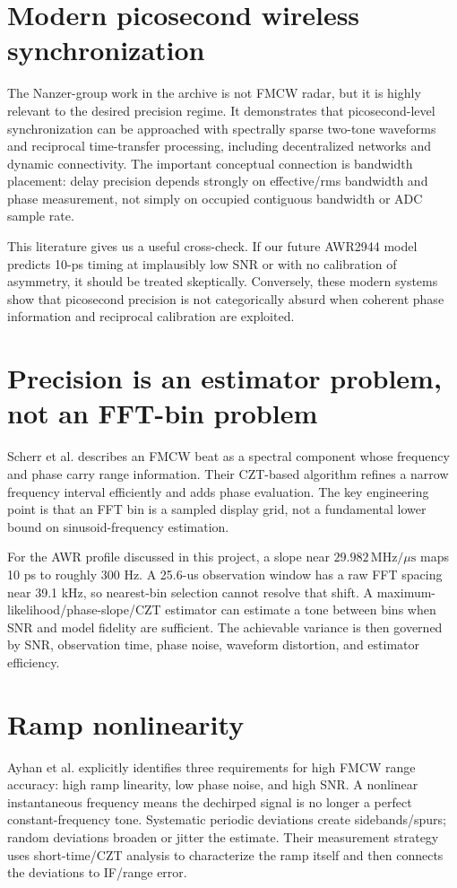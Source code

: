 \documentclass[11pt]{article}
\begin{document}
\section{Modern picosecond wireless synchronization}
The Nanzer-group work in the archive is not FMCW radar, but it is highly relevant to the desired precision regime. It demonstrates that picosecond-level synchronization can be approached with spectrally sparse two-tone waveforms and reciprocal time-transfer processing, including decentralized networks and dynamic connectivity. The important conceptual connection is bandwidth placement: delay precision depends strongly on effective/rms bandwidth and phase measurement, not simply on occupied contiguous bandwidth or ADC sample rate.

This literature gives us a useful cross-check. If our future AWR2944 model predicts 10-ps timing at implausibly low SNR or with no calibration of asymmetry, it should be treated skeptically. Conversely, these modern systems show that picosecond precision is not categorically absurd when coherent phase information and reciprocal calibration are exploited.

\section{Precision is an estimator problem, not an FFT-bin problem}
Scherr et al. describes an FMCW beat as a spectral component whose frequency and phase carry range information. Their CZT-based algorithm refines a narrow frequency interval efficiently and adds phase evaluation. The key engineering point is that an FFT bin is a sampled display grid, not a fundamental lower bound on sinusoid-frequency estimation.

For the AWR profile discussed in this project, a slope near $29.982\,\mathrm{MHz}/\mu\mathrm{s}$ maps 10 ps to roughly 300 Hz. A 25.6-us observation window has a raw FFT spacing near 39.1 kHz, so nearest-bin selection cannot resolve that shift. A maximum-likelihood/phase-slope/CZT estimator can estimate a tone between bins when SNR and model fidelity are sufficient. The achievable variance is then governed by SNR, observation time, phase noise, waveform distortion, and estimator efficiency.

\section{Ramp nonlinearity}
Ayhan et al. explicitly identifies three requirements for high FMCW range accuracy: high ramp linearity, low phase noise, and high SNR. A nonlinear instantaneous frequency means the dechirped signal is no longer a perfect constant-frequency tone. Systematic periodic deviations create sidebands/spurs; random deviations broaden or jitter the estimate. Their measurement strategy uses short-time/CZT analysis to characterize the ramp itself and then connects the deviations to IF/range error.
\end{document}
